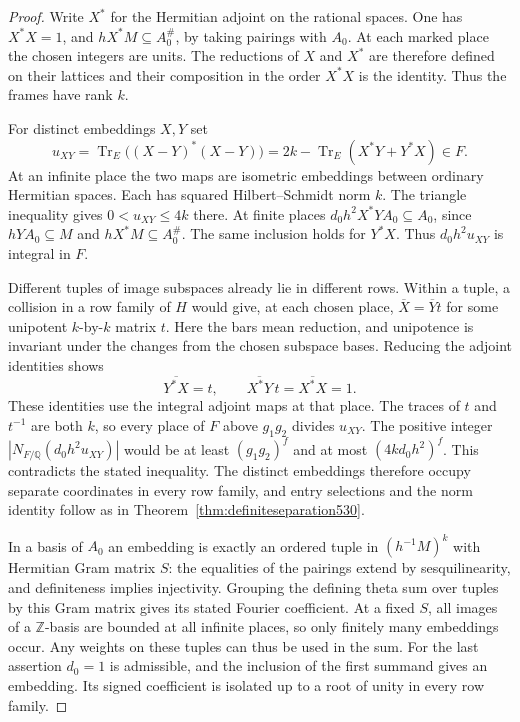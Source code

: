 \documentclass[a4paper,11pt]{article}
\theoremstyle{definition}
\theoremstyle{remark}
\numberwithin{equation}{section}
\begin{document}
\begin{proof}
Write \(X^*\) for the Hermitian adjoint on the rational spaces.
One has \(X^*X=1\), and \(h X^*M\subseteq A_0^\#\), by taking
pairings with \(A_0\). At each marked place the chosen integers
are units. The reductions of \(X\) and \(X^*\) are therefore
defined on their lattices and their composition in the order
\(X^*X\) is the identity. Thus the frames have rank \(k\).

For distinct embeddings \(X,Y\) set
\[
      u_{XY}=\operatorname{Tr}_E\big((X-Y)^*(X-Y)\big)
             =2k-\operatorname{Tr}_E(X^*Y+Y^*X)\in F.
\]
At an infinite place the two maps are isometric embeddings
between ordinary Hermitian spaces. Each has squared
Hilbert--Schmidt norm \(k\). The triangle inequality gives
\(0<u_{XY}\le4k\) there. At finite places
\(d_0h^2 X^*Y A_0\subseteq A_0\), since \(hY A_0\subseteq M\)
and \(h X^*M\subseteq A_0^\#\). The same inclusion holds for
\(Y^*X\). Thus \(d_0h^2 u_{XY}\) is integral in \(F\).

Different tuples of image subspaces already lie in different
rows. Within a tuple, a collision in a row family of \(H\)
would give, at each chosen place, \(\overline X=\overline Y t\)
for some unipotent \(k\)-by-\(k\) matrix \(t\). Here the bars
mean reduction, and unipotence is invariant under the changes
from the chosen subspace bases. Reducing the adjoint identities
shows
\[
     \overline{Y^*X}=t,\qquad
     \overline{X^*Y}\,t=\overline{X^*X}=1.
\]
These identities use the integral adjoint maps at that place.
The traces of \(t\) and \(t^{-1}\) are both \(k\), so every
place of \(F\) above \(g_1g_2\) divides \(u_{XY}\). The positive
integer \(|N_{F/\mathbb Q}(d_0h^2 u_{XY})|\) would be at least
\((g_1g_2)^f\) and at most \((4k d_0h^2)^f\). This contradicts
the stated inequality. The distinct embeddings therefore occupy
separate coordinates in every row family, and entry selections
and the norm identity follow as in
Theorem~\ref{thm:definiteseparation530}.

In a basis of \(A_0\) an embedding is exactly an ordered tuple in
\((h^{-1}M)^k\) with Hermitian Gram matrix \(S\): the equalities
of the pairings extend by sesquilinearity, and definiteness
implies injectivity. Grouping the defining theta sum over tuples
by this Gram matrix gives its stated Fourier coefficient.
At a fixed \(S\), all images of a \(\mathbb Z\)-basis are
bounded at all infinite places, so only finitely many embeddings
occur. Any weights on these tuples can thus be used in the sum.
For the last assertion \(d_0=1\) is admissible, and the inclusion
of the first summand gives an embedding. Its signed coefficient
is isolated up to a root of unity in every row family.
\end{proof}
\end{document}
